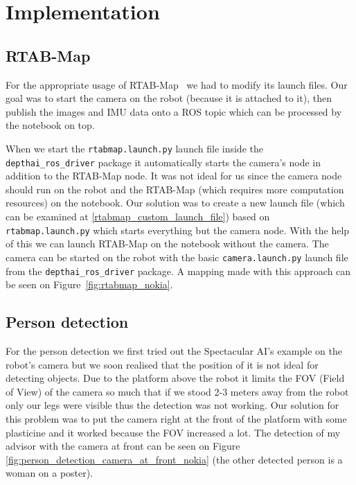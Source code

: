 \chapter{Implementation} \label{implementation}

\section{RTAB-Map}

For the appropriate usage of RTAB-Map~\cite{RTAB_Map_docs} we had to modify its launch files. Our goal was to start the camera on the robot (because it is attached to it), then publish the images and IMU data onto a ROS topic which can be processed by the notebook on top.

When we start the \verb|rtabmap.launch.py| launch file inside the \verb|depthai_ros_driver| package it automatically starts the camera's node in addition to the RTAB-Map node. It was not ideal for us since the camera node should run on the robot and the RTAB-Map (which requires more computation resources) on the notebook. Our solution was to create a new launch file (which can be examined at \ref{rtabmap_custom_launch_file}) based on \verb|rtabmap.launch.py| which starts everything but the camera node. With the help of this we can launch RTAB-Map on the notebook without the camera. The camera can be started on the robot with the basic \verb|camera.launch.py| launch file from the \verb|depthai_ros_driver| package. A mapping made with this approach can be seen on Figure~\ref{fig:rtabmap_nokia}.

\section{Person detection}

For the person detection we first tried out the Spectacular AI's example on the robot's camera but we soon realised that the position of it is not ideal for detecting objects. Due to the platform above the robot it limits the FOV (Field of View) of the camera so much that if we stood 2-3 meters away from the robot only our legs were visible thus the detection was not working. Our solution for this problem was to put the camera right at the front of the platform with some plasticine and it worked because the FOV increased a lot. The detection of my advisor with the camera at front can be seen on Figure \ref{fig:person_detection_camera_at_front_nokia} (the other detected person is a woman on a poster).

